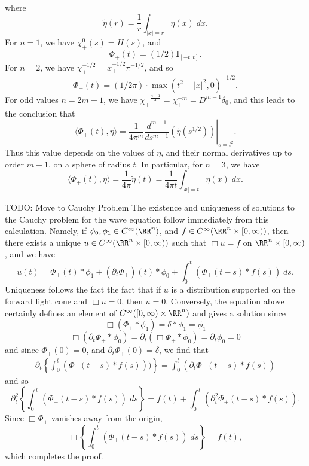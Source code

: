 \begin{example}
    where
    \[ \tilde{\eta}(r) = \frac{1}{r} \int_{|x| = r} \eta(x)\; dx.  \]
    For $n = 1$, we have $\chi_+^0(s) = H(s)$, and
    \[ \Phi_+(t) = (1/2) \mathbf{I}_{[-t,t]}. \]
    For $n = 2$, we have $\chi_+^{-1/2} = x_+^{-1/2} \pi^{-1/2}$, and so
    \[ \Phi_+(t) = (1/2 \pi) \cdot \max(t^2 - |x|^2, 0)^{-1/2}. \]
    For odd values $n = 2 m + 1$, we have $\chi_+^{- \frac{n-1}{2}} = \chi_+^{-m} = D^{m-1} \delta_0$, and this leads to the conclusion that
    \[ \langle \Phi_+(t), \eta \rangle = \frac{1}{4 \pi^m} \left. \frac{d^{m-1}}{ds^{m-1}} \left( \tilde{\eta}(s^{1/2}) \right) \right|_{s = t^2}. \]
    Thus this value depends on the values of $\eta$, and their normal derivatives up to order $m-1$, on a sphere of radius $t$. In particular, for $n = 3$, we have
    \[ \langle \Phi_+(t), \eta \rangle = \frac{1}{4 \pi} \tilde{\eta}(t) = \frac{1}{4 \pi t} \int_{|x| = t} \eta(x)\; dx. \]
\end{example}

TODO: Move to Cauchy Problem The existence and uniqueness of solutions to the Cauchy problem for the wave equation follow immediately from this calculation. Namely, if $\phi_0, \phi_1 \in C^\infty(\RR^n)$, and $f \in C^\infty(\RR^n \times [0,\infty))$, then there exists a unique $u \in C^\infty(\RR^n \times [0,\infty))$ such that $\Box u = f$ on $\RR^n \times [0,\infty)$, and we have
%
\[ u(t) = \Phi_+(t) * \phi_1 + (\partial_t \Phi_+)(t) * \phi_0 + \int_0^t (\Phi_+(t-s) * f(s))\; ds. \]
%
Uniqueness follows the fact the fact that if $u$ is a distribution supported on the forward light cone and $\Box u = 0$, then $u = 0$. Conversely, the equation above certainly defines an element of $C^\infty([0,\infty) \times \RR^n)$ and gives a solution since
%
\[ \Box (\Phi_+ * \phi_1) = \delta * \phi_1 = \phi_1 \]
%
\[ \Box (\partial_t \Phi_+ * \phi_0) = \partial_t (\Box \Phi_+ * \phi_0) = \partial_t \phi_0 = 0 \]
%
and since $\Phi_+(0) = 0$, and $\partial_t \Phi_+(0) = \delta$, we find that
%
\begin{align*}
    \partial_t \left\{ \int_0^t (\Phi_+(t-s) * f(s))) \right\} = \int_0^t (\partial_t \Phi_+(t-s) * f(s))
\end{align*}
%
and so
%
\[ \partial_t^2 \left\{ \int_0^t (\Phi_+(t-s) * f(s))\; ds \right\} = f(t) + \int_0^t (\partial_t^2 \Phi_+(t-s) * f(s)). \]
%
Since $\Box \Phi_+$ vanishes away from the origin,
%
\[ \Box \left\{ \int_0^t (\Phi_+(t-s) * f(s))\; ds \right\} = f(t), \]
%
which completes the proof.

